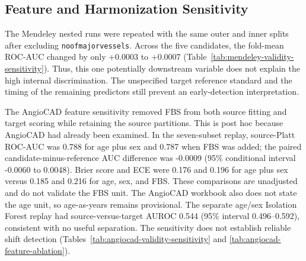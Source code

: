 \documentclass[journal]{IEEEtran}
\begin{document}
\subsection{Feature and Harmonization Sensitivity}\label{sec:validity-sensitivity}
The Mendeley nested runs were repeated with the same outer and inner splits
after excluding \texttt{noofmajorvessels}. Across the five candidates, the
fold-mean ROC-AUC changed by only +0.0003 to +0.0007
(Table~\ref{tab:mendeley-validity-sensitivity}). Thus, this one potentially
downstream variable does not explain the high internal discrimination. The
unspecified target reference
standard and the timing of the remaining predictors still prevent an
early-detection interpretation.

The AngioCAD feature sensitivity removed FBS from both source fitting and
target scoring while retaining the source partitions. This is post hoc because
AngioCAD had already been examined. In the seven-subset replay, source-Platt
ROC-AUC was 0.788 for age plus sex and 0.787 when FBS was added; the paired
candidate-minus-reference AUC difference was -0.0009 (95\% conditional
interval -0.0060 to 0.0048). Brier score and ECE were 0.176 and 0.196 for
age plus sex versus 0.185 and 0.216 for age, sex, and FBS. These comparisons
are unadjusted and do not validate the FBS unit. The AngioCAD workbook also
does not state the age unit, so age-as-years remains provisional. The separate
age/sex Isolation Forest replay had source-versus-target AUROC 0.544 (95\%
interval 0.496--0.592), consistent with no useful separation. The sensitivity
does not establish reliable shift detection
(Tables~\ref{tab:angiocad-validity-sensitivity} and
\ref{tab:angiocad-feature-ablation}).

\begin{table}[t]
\centering
\caption{Mendeley nested-validation sensitivity after excluding the potentially
post-diagnostic fluoroscopy-derived predictor. Entries are fold-mean ROC-AUC
$\pm$ fold standard deviation across the same three outer folds; they are
descriptive, not patient-level confidence intervals.}
\label{tab:mendeley-validity-sensitivity}

\end{table}

\begin{table}[t]
\centering
\caption{Post-hoc AngioCAD sensitivity to the undocumented FBS unit. Predictive
bootstrap intervals condition on the 79 negative and 298 positive matched
records. OOD intervals compare source-calibration and target feature scores.}
\label{tab:angiocad-validity-sensitivity}

\end{table}
\end{document}
